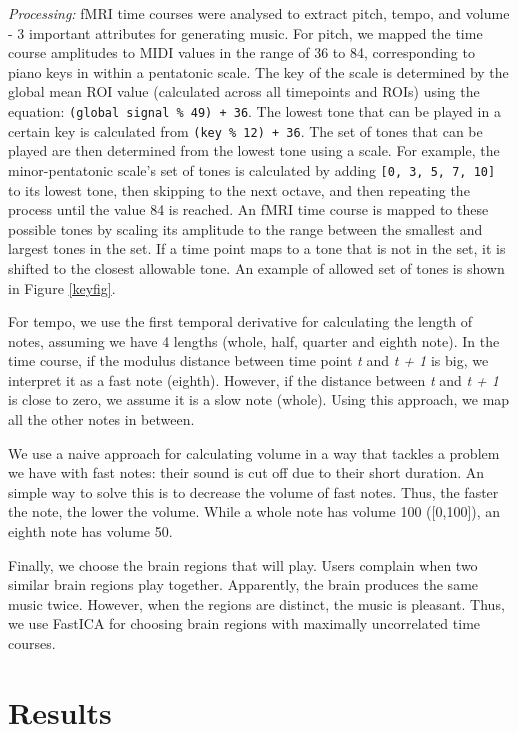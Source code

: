 \documentclass[twocolumn]{bmcart}%
\begin{document}
\textit{Processing:} fMRI time courses were analysed to extract pitch,
tempo, and volume - 3 important attributes for generating music. For
pitch, we mapped the time course amplitudes to MIDI values in the range
of 36 to 84, corresponding to piano keys in within a pentatonic scale.
The key of the scale is determined by the global mean ROI value
(calculated across all timepoints and ROIs) using the equation:
\texttt{(global signal \% 49) + 36}. The lowest tone that can be played
in a certain key is calculated from \texttt{(key \% 12) + 36}. The set
of tones that can be played are then determined from the lowest tone
using a scale. For example, the minor-pentatonic scale's set of tones is
calculated by adding \texttt{[0, 3, 5, 7, 10]} to its lowest tone, then
skipping to the next octave, and then repeating the process until the
value 84 is reached. An fMRI time course is mapped to these possible
tones by scaling its amplitude to the range between the smallest and
largest tones in the set. If a time point maps to a tone that is not in
the set, it is shifted to the closest allowable tone. An example of
allowed set of tones is shown in Figure \ref{keyfig}.

For tempo, we use the first temporal derivative for calculating the
length of notes, assuming we have 4 lengths (whole, half, quarter and
eighth note). In the time course, if the modulus distance between time
point \textit{t} and \textit{t + 1} is big, we interpret it as a fast
note (eighth). However, if the distance between \textit{t} and
\textit{t + 1} is close to zero, we assume it is a slow note (whole).
Using this approach, we map all the other notes in between.

We use a naive approach for calculating volume in a way that tackles a
problem we have with fast notes: their sound is cut off due to their
short duration. An simple way to solve this is to decrease the volume of
fast notes. Thus, the faster the note, the lower the volume. While a
whole note has volume 100 ({[}0,100{]}), an eighth note has volume 50.

Finally, we choose the brain regions that will play. Users complain when
two similar brain regions play together. Apparently, the brain produces
the same music twice. However, when the regions are distinct, the music
is pleasant. Thus, we use FastICA \cite{scikitlearn} for choosing brain
regions with maximally uncorrelated time courses.

\section{Results}\label{results}
\end{document}
